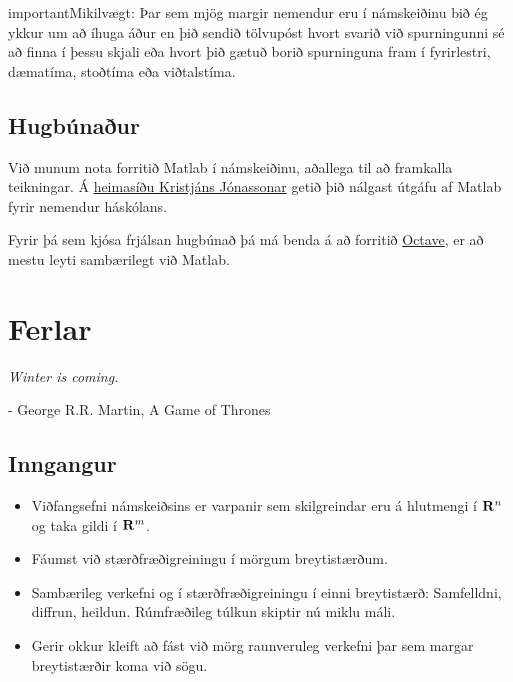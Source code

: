 \documentclass[a4paper,10pt,icelandic]{sphinxmanual}
\begin{document}
\begin{notice}{important}{Mikilvægt:}
Þar sem mjög margir nemendur eru í námskeiðinu bið ég ykkur um að íhuga  áður en þið sendið tölvupóst hvort svarið við spurningunni
sé að finna í þessu skjali eða hvort þið gætuð borið spurninguna fram í fyrirlestri, dæmatíma, stoðtíma eða viðtalstíma.
\end{notice}


\section*{Hugbúnaður}
\label{umnamskeidid:hugbunaur}
Við munum nota forritið Matlab í námskeiðinu, aðallega til að framkalla teikningar. Á \href{http://notendur.hi.is/jonasson/matlab/}{heimasíðu Kristjáns Jónassonar} getið þið nálgast útgáfu af Matlab fyrir nemendur háskólans.

Fyrir þá sem kjósa frjálsan hugbúnað þá má benda á að forritið \href{http://www.gnu.org/software/octave}{Octave}, er að mestu leyti sambærilegt við Matlab.


\chapter{Ferlar}
\label{Kafli1::doc}\label{Kafli1:ferlar}
\emph{Winter is coming.}

- George R.R. Martin, A Game of Thrones


\section{Inngangur}
\label{Kafli1:inngangur}\begin{itemize}
\item {} 
Viðfangsefni námskeiðsins er varpanir sem skilgreindar eru á
hlutmengi í \(\mbox{${\bf R}^n$}\) og taka gildi í
\(\mbox{${\bf R}^m$}\).

\item {} 
Fáumst við stærðfræðigreiningu í mörgum breytistærðum.

\item {} 
Sambærileg verkefni og í stærðfræðigreiningu í einni breytistærð:
Samfelldni, diffrun, heildun. Rúmfræðileg túlkun skiptir nú miklu
máli.

\item {} 
Gerir okkur kleift að fást við mörg raunveruleg verkefni þar sem
margar breytistærðir koma við sögu.

\end{itemize}
\end{document}
